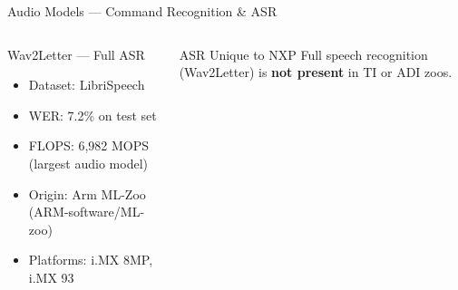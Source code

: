 \documentclass[aspectratio=169]{beamer}
\begin{document}
\begin{frame}{Audio Models — Command Recognition \& ASR}
\begin{columns}[T]
\begin{block}{Wav2Letter — Full ASR}
\begin{itemize}
          \item Dataset: LibriSpeech
          \item WER: \alert{7.2\%} on test set
          \item FLOPS: \alert{6,982 MOPS} (largest audio model)
          \item Origin: Arm ML-Zoo (ARM-software/ML-zoo)
          \item Platforms: i.MX 8MP, i.MX 93
        \end{itemize}
      \end{block}
      \vspace{4pt}
      \begin{alertblock}{ASR Unique to NXP}
        Full speech recognition (Wav2Letter) is \textbf{not present} in TI or ADI zoos.
      \end{alertblock}
  \end{columns}
\end{frame}
\end{document}
